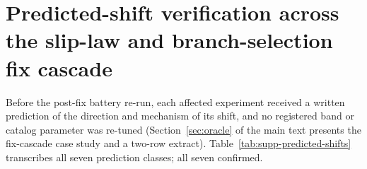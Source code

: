\section{Predicted-shift verification across the slip-law and
  branch-selection fix cascade}
\label{sec:supp-predicted-shifts}

Before the post-fix battery re-run, each affected experiment received a
written prediction of the direction and mechanism of its shift, and no
registered band or catalog parameter was re-tuned
(Section~\ref{sec:oracle} of the main text presents the fix-cascade case
study and a two-row extract). Table~\ref{tab:supp-predicted-shifts}
transcribes all seven prediction classes; all seven confirmed.

